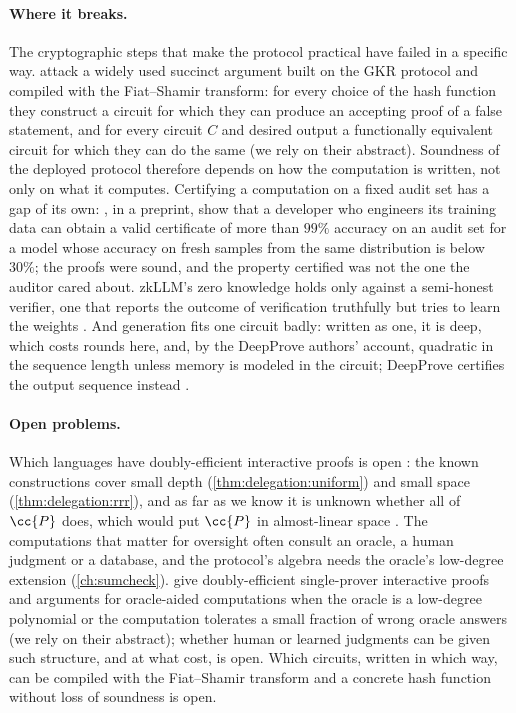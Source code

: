 \begin{refsection}
\paragraph{Where it breaks.} The cryptographic steps that make the protocol practical have failed in a specific way. \Textcite{KhovratovichRothblumSoukhanov2025} attack a widely used succinct argument built on the GKR protocol and compiled with the Fiat--Shamir transform: for every choice of the hash function they construct a circuit for which they can produce an accepting proof of a false statement, and for every circuit $C$ and desired output a functionally equivalent circuit for which they can do the same (we rely on their abstract). Soundness of the deployed protocol therefore depends on how the computation is written, not only on what it computes. Certifying a computation on a fixed audit set has a gap of its own: \textcite{LuckEtAl2026}, in a preprint, show that a developer who engineers its training data can obtain a valid certificate of more than $99\%$ accuracy on an audit set for a model whose accuracy on fresh samples from the same distribution is below $30\%$; the proofs were sound, and the property certified was not the one the auditor cared about. zkLLM's zero knowledge holds only against a semi-honest verifier, one that reports the outcome of verification truthfully but tries to learn the weights \parencite{SunLiZhang2024}. And generation fits one circuit badly: written as one, it is deep, which costs rounds here, and, by the DeepProve authors' account, quadratic in the sequence length unless memory is modeled in the circuit; DeepProve certifies the output sequence instead \parencite{GaillyEtAl2026}.

\paragraph{Open problems.} Which languages have doubly-efficient interactive proofs is open \parencite{ReingoldRothblumRothblum2021}: the known constructions cover small depth (\cref{thm:delegation:uniform}) and small space (\cref{thm:delegation:rrr}), and as far as we know it is unknown whether all of $\cc{P}$ does, which would put $\cc{P}$ in almost-linear space \parencite[\S1.4]{Goldreich2018}. The computations that matter for oversight often consult an oracle, a human judgment or a database, and the protocol's algebra needs the oracle's low-degree extension (\cref{ch:sumcheck}). \Textcite{ChenKalaiXi2026} give doubly-efficient single-prover interactive proofs and arguments for oracle-aided computations when the oracle is a low-degree polynomial or the computation tolerates a small fraction of wrong oracle answers (we rely on their abstract); whether human or learned judgments can be given such structure, and at what cost, is open. Which circuits, written in which way, can be compiled with the Fiat--Shamir transform and a concrete hash function without loss of soundness is open.


\end{refsection}
